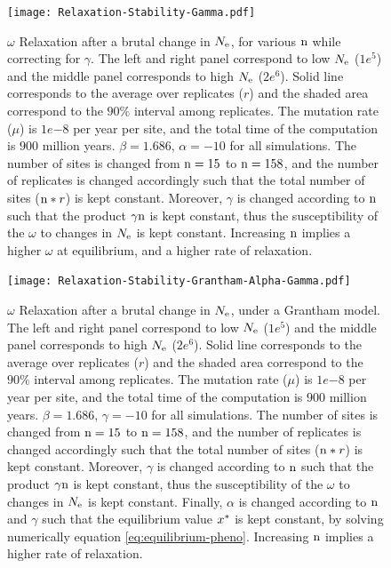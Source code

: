 \begin{figure}[H]
	\centering
	\texttt{[image: Relaxation-Stability-Gamma.pdf]}
	\caption[Relaxation time of $\omega$ dependence on $\Nsites$, while correction for $\gamma$]{
	$\omega$ Relaxation after a brutal change in $N_{\mathrm{e}}$, for various $\Nsites$ while correcting for $\gamma$.
	The left and right panel correspond to low $N_{\mathrm{e}}$ ($1e^{5}$) and the middle panel corresponds to high $N_{\mathrm{e}}$ ($2e^{6}$).
	Solid line corresponds to the average over replicates ($r$) and the shaded area correspond to the $90\%$ interval among replicates.
	The mutation rate ($\mu$) is $1e{-8}$ per year per site, and the total time of the computation is $900$ million years.
	$\beta=1.686$, $\alpha=-10$ for all simulations. The number of sites is changed from $\text{n}=15$ to $\text{n}=158$, and the number of replicates is changed accordingly such that the total number of sites ($\text{n}*r$) is kept constant.
	Moreover, $\gamma$ is changed according to $\text{n}$ such that the product $\gamma\text{n}$ is kept constant, thus the  susceptibility of the $\omega$ to changes in $N_{\mathrm{e}}$ is kept constant.
	Increasing $\text{n}$ implies a higher $\omega$ at equilibrium, and a higher rate of relaxation.
	}
\end{figure}

\begin{figure}[H]
	\centering
	\texttt{[image: Relaxation-Stability-Grantham-Alpha-Gamma.pdf]}
	\caption[Relaxation time of $\omega$ for the Grantham model]{
	$\omega$ Relaxation after a brutal change in $N_{\mathrm{e}}$, under a Grantham model.
	The left and right panel correspond to low $N_{\mathrm{e}}$ ($1e^{5}$) and the middle panel corresponds to high $N_{\mathrm{e}}$ ($2e^{6}$).
	Solid line corresponds to the average over replicates ($r$) and the shaded area correspond to the $90\%$ interval among replicates.
	The mutation rate ($\mu$) is $1e{-8}$ per year per site, and the total time of the computation is $900$ million years.
	$\beta=1.686$, $\gamma=-10$ for all simulations. The number of sites is changed from $\text{n}=15$ to $\text{n}=158$, and the number of replicates is changed accordingly such that the total number of sites ($\text{n}*r$) is kept constant.
	Moreover, $\gamma$ is changed according to $\text{n}$ such that the product $\gamma\text{n}$ is kept constant, thus the  susceptibility of the $\omega$ to changes in $N_{\mathrm{e}}$ is kept constant.
	Finally, $\alpha$ is changed according to $\text{n}$ and $\gamma$ such that the equilibrium value $x^{*}$ is kept constant, by solving numerically equation \ref{eq:equilibrium-pheno}.
	Increasing $\text{n}$ implies a higher rate of relaxation.}
\end{figure}

